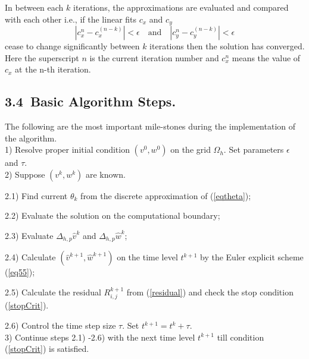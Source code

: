 \documentclass[leqno,11pt]{book}
\newcommand{\rf}[1]{(\ref{#1})}
\begin{document}
In between each $k$ iterations, the approximations are evaluated and compared with each other i.e., if the linear fits $c_{x}$ and $c_{y}$
\begin{equation}\label{stopCrit}
|c_{x}^{n} - c_{x}^{(n-k)}| < \epsilon \quad \textrm{and} \quad |c_{y}^{n} - c_{y}^{(n-k)}| < \epsilon
\end{equation}
cease to change significantly between $k$ iterations then the solution has converged. Here the superscript $n$ is the current iteration number and $c_{x}^{n}$ means the value of $c_{x}$ at the n-th iteration.

\subsection{3.4~Basic Algorithm Steps.}
The following are the most important mile-stones during the implementation of the algorithm.
\\
1) Resolve proper initial condition $(v^0, w^0)$ on the grid $\Omega_h$.  Set parameters $\epsilon$ and $\tau$.
\\
2) Suppose $(v^k, w^k)$ are known. 
\par
2.1) Find current $\theta_k$ from the discrete approximation of \rf{eqtheta};
\par
2.2) Evaluate the solution on the computational boundary;
\par
2.3) Evaluate $\Delta_{h,p}  \widehat{v}^k$ and $\Delta_{h,p}  \widehat{w}^k$;
\par
2.4) Calculate $(\widehat{v}^{k+1}, \widehat{w}^{k+1})$  on the  time level $t^{k+1}$ by the Euler explicit scheme   \rf{eq55};
\par
2.5) Calculate the residual $R^{k+1}_{i,j}$ from \rf{residual} and check the stop condition \rf{stopCrit}.
\par
2.6) Control the time step size $\tau$. Set $t^{k+1}=t^{k}+\tau$.
\\
3) Continue steps 2.1) -2.6) with the next time level $t^{k+1}$ till condition (\ref{stopCrit}) is satisfied.
\end{document}
